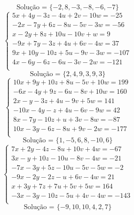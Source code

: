 \documentclass[12pt,oneside,a4paper]{article}
\begin{document}
\begin{equation*}
\text{Solução = }\{-2,8,-3,-8,-6,-7\}
\end{equation*}
\vspace{\baselineskip}
\begin{equation*}
\begin{cases}
5x+4y-3z-4u+2v-10w=-25 \\
-2x-7y+6z-8u-5v-3w=-56 \\
x-2y+8z+10u-10v+w=9 \\
-9x+7y-3z+4u+6v-4w=37 \\
9x+10y-10z+5u-9v-3w=-107 \\
4x-6y-6z-6u-3v-2w=-121 \\
\end{cases}
\end{equation*}
\begin{equation*}
\text{Solução = }\{2,4,9,3,9,3\}
\end{equation*}
\vspace{\baselineskip}
\begin{equation*}
\begin{cases}
10x+9y+10z+8u-5v+10w=199 \\
-6x-4y+9z-6u-8v+10w=160 \\
2x-y-3z+4u-9v+5w=141 \\
-10x-4y-z+4u-6v-9w=42 \\
8x-7y-10z+u+3v-8w=-87 \\
10x-3y-6z-8u+9v-2w=-177 \\
\end{cases}
\end{equation*}
\begin{equation*}
\text{Solução = }\{1,-5,6,8,-10,6\}
\end{equation*}
\vspace{\baselineskip}
\begin{equation*}
\begin{cases}
7x+2y-4z-8u+10v+4w=-67 \\
3x-y+10z-10u-8v-4w=-21 \\
-7x-3y+5z-10u-5v-5w=-2 \\
-9x-2y-2z-u+6v-4w=21 \\
x+3y+7z+7u+5v+5w=164 \\
-3x-3y-10z-5u+4v-4w=-143 \\
\end{cases}
\end{equation*}
\begin{equation*}
\text{Solução = }\{-9,10,10,4,2,7\}
\end{equation*}
\end{document}
